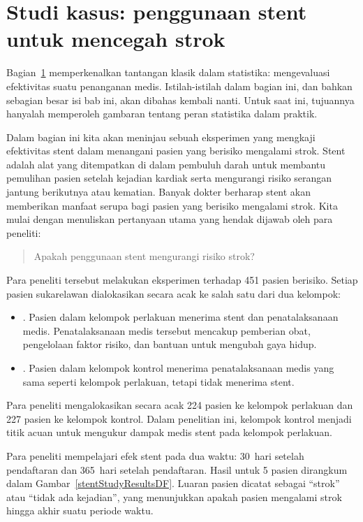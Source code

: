\section{Studi kasus: penggunaan stent untuk mencegah strok}
\label{basicExampleOfStentsAndStrokes}


Bagian~\ref{basicExampleOfStentsAndStrokes} memperkenalkan tantangan klasik dalam statistika: mengevaluasi efektivitas suatu penanganan medis. Istilah-istilah dalam bagian ini, dan bahkan sebagian besar isi bab ini, akan dibahas kembali nanti. Untuk saat ini, tujuannya hanyalah memperoleh gambaran tentang peran statistika dalam praktik.

Dalam bagian ini kita akan meninjau sebuah eksperimen yang mengkaji efektivitas stent dalam menangani pasien yang berisiko mengalami strok.
Stent adalah alat yang ditempatkan di dalam pembuluh darah untuk membantu pemulihan pasien setelah kejadian kardiak serta mengurangi risiko serangan jantung berikutnya atau kematian. Banyak dokter berharap stent akan memberikan manfaat serupa bagi pasien yang berisiko mengalami strok. Kita mulai dengan menuliskan pertanyaan utama yang hendak dijawab oleh para peneliti:
\begin{quote}
Apakah penggunaan stent mengurangi risiko strok?
\end{quote}

Para peneliti tersebut melakukan eksperimen terhadap 451 pasien berisiko. Setiap pasien sukarelawan dialokasikan secara acak ke salah satu dari dua kelompok:
\begin{itemize}
\item[]. Pasien dalam kelompok perlakuan menerima stent dan penatalaksanaan medis. Penatalaksanaan medis tersebut mencakup pemberian obat, pengelolaan faktor risiko, dan bantuan untuk mengubah gaya hidup.
\item[]. Pasien dalam kelompok kontrol menerima penatalaksanaan medis yang sama seperti kelompok perlakuan, tetapi tidak menerima stent.
\end{itemize}
Para peneliti mengalokasikan secara acak 224 pasien ke kelompok perlakuan dan 227 pasien ke kelompok kontrol. Dalam penelitian ini, kelompok kontrol menjadi titik acuan untuk mengukur dampak medis stent pada kelompok perlakuan.

Para peneliti mempelajari efek stent pada dua waktu: 30~hari setelah pendaftaran dan 365~hari setelah pendaftaran. Hasil untuk 5 pasien dirangkum dalam Gambar~\ref{stentStudyResultsDF}. Luaran pasien dicatat sebagai ``strok'' atau ``tidak ada kejadian'', yang menunjukkan apakah pasien mengalami strok hingga akhir suatu periode waktu.

